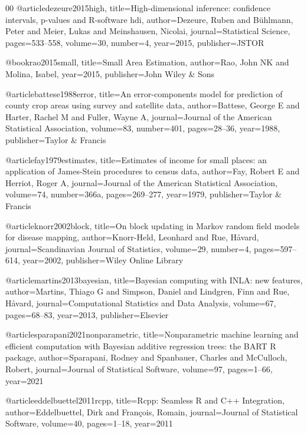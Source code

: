 \documentclass[preprint,12pt]{elsarticle}
\begin{document}
\begin{thebibliography}{00}
@article{dezeure2015high,
  title={High-dimensional inference: confidence intervals, p-values and {R}-software hdi},
  author={Dezeure, Ruben and B{\"u}hlmann, Peter and Meier, Lukas and Meinshausen, Nicolai},
  journal={Statistical Science},
  pages={533--558},
volume={30},
number={4},
  year={2015},
  publisher={JSTOR}
}

@book{rao2015small,
  title={Small Area Estimation},
  author={Rao, John NK and Molina, Isabel},
  year={2015},
  publisher={John Wiley \& Sons}
}

@article{battese1988error,
  title={An error-components model for prediction of county crop areas using survey and satellite data},
  author={Battese, George E and Harter, Rachel M and Fuller, Wayne A},
  journal={Journal of the American Statistical Association},
  volume={83},
  number={401},
  pages={28--36},
  year={1988},
  publisher={Taylor \& Francis}
}

@article{fay1979estimates,
  title={Estimates of income for small places: an application of {James-Stein} procedures to census data},
  author={Fay, Robert E and Herriot, Roger A},
  journal={Journal of the American Statistical Association},
  volume={74},
  number={366a},
  pages={269--277},
  year={1979},
  publisher={Taylor \& Francis}
}

@article{knorr2002block,
  title={On block updating in {M}arkov random field models for disease mapping},
  author={Knorr-Held, Leonhard and Rue, H{\aa}vard},
  journal={Scandinavian Journal of Statistics},
  volume={29},
  number={4},
  pages={597--614},
  year={2002},
  publisher={Wiley Online Library}
}

@article{martins2013bayesian,
  title={Bayesian computing with {INLA}: new features},
  author={Martins, Thiago G and Simpson, Daniel and Lindgren, Finn and Rue, H{\aa}vard},
  journal={Computational Statistics and Data Analysis},
  volume={67},
  pages={68--83},
  year={2013},
  publisher={Elsevier}
}

@article{sparapani2021nonparametric,
  title={{Nonparametric machine learning and efficient computation with Bayesian additive regression trees: the BART R package}},
  author={Sparapani, Rodney and Spanbauer, Charles and McCulloch, Robert},
  journal={Journal of Statistical Software},
  volume={97},
  pages={1--66},
  year={2021}
}

@article{eddelbuettel2011rcpp,
  title={{Rcpp: Seamless R and C++ Integration}},
  author={Eddelbuettel, Dirk and Fran{\c{c}}ois, Romain},
  journal={Journal of Statistical Software},
  volume={40},
  pages={1--18},
  year={2011}
}


\end{thebibliography}
\end{document}
